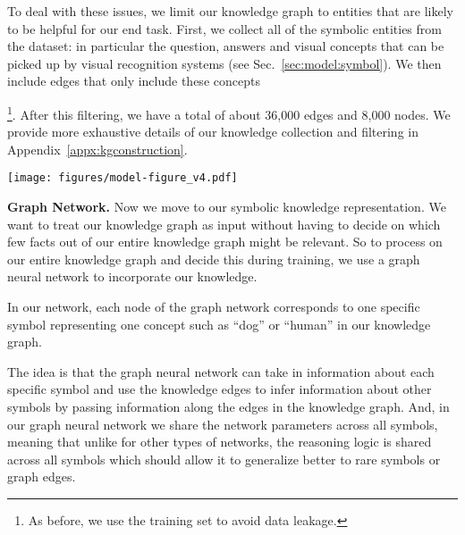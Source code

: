 \documentclass[final]{cvpr}
\providecommand{\ModelName}{KRISP\xspace}
\providecommand{\myparagraph}[1]{\noindent\textbf{#1.}}
\begin{document}
To deal with these issues, we limit our knowledge graph to entities that are likely to be helpful for our end task. First, we collect all of the symbolic entities from the dataset: in particular the question, answers and visual concepts that can be picked up by visual recognition systems (see Sec.~\ref{sec:model:symbol}). We then include edges that only include these concepts

\footnote{As before, we use the training set to avoid data leakage.}. After this filtering, we have 
a total of about 36,000 edges and 8,000 nodes. We provide more exhaustive details of our knowledge collection and filtering in Appendix~\ref{appx:kgconstruction}.


\begin{figure*}[t]
\centering
\texttt{[image: figures/model-figure\_v4.pdf]}
\vspace{.1cm}
\caption{Our model \ModelName integrates implicit knowledge and reasoning (bottom) with explicit graph-based reasoning on a knowledge base (top). The implicit knowledge model receives the visual features and question encoding whereas the explicit knowledge model operates on image and question symbols. They predict answers according to Eq.~\ref{eq:implicit}\&\ref{eq:symbolic} and we take the max overall prediction (see Sec.~\ref{sec:model:integration}).
}
\vspace{-.3cm}
\label{fig:model}
\end{figure*}


\myparagraph{Graph Network}
\label{sec:graphnetwork}
Now we move to our symbolic knowledge representation. We want to treat our knowledge graph as input without having to decide on which few facts out of our entire knowledge graph might be relevant. So to process on our entire knowledge graph and decide this during training, we use a graph neural network to incorporate our knowledge.

In our network, each node of the graph network corresponds to one specific symbol representing one concept such as ``dog'' or ``human'' in our knowledge graph.

The idea is that the graph neural network can take in information about each specific symbol and use the knowledge edges to infer information about other symbols by passing information along the edges in the knowledge graph. And, in our  
graph neural network we share the network parameters across all symbols, meaning that unlike for other types of networks, the reasoning logic is shared across all symbols which should allow it to generalize better to rare symbols or graph edges.
\end{document}
